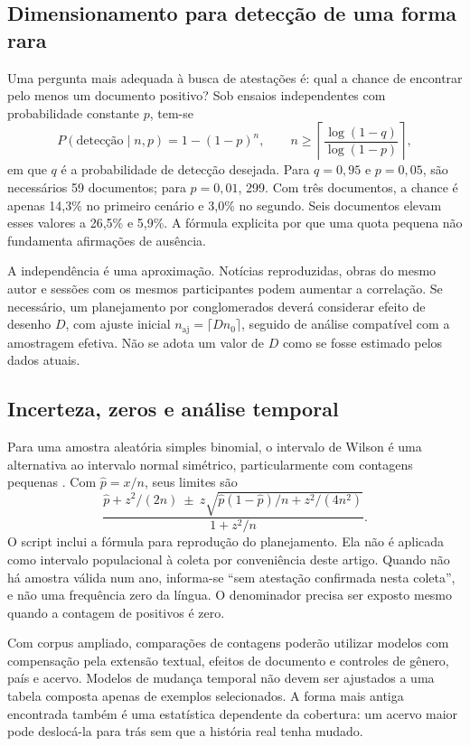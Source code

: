 \subsection{Dimensionamento para detecção de uma forma rara}
Uma pergunta mais adequada à busca de atestações é: qual a chance de encontrar pelo menos um documento positivo? Sob ensaios independentes com probabilidade constante $p$, tem-se
\begin{equation}
P(\text{detecção}\mid n,p)=1-(1-p)^n,
\qquad n\geq\left\lceil\frac{\log(1-q)}{\log(1-p)}\right\rceil,
\end{equation}
em que $q$ é a probabilidade de detecção desejada. Para $q=0{,}95$ e $p=0{,}05$, são necessários 59 documentos; para $p=0{,}01$, 299. Com três documentos, a chance é apenas 14,3\% no primeiro cenário e 3,0\% no segundo. Seis documentos elevam esses valores a 26,5\% e 5,9\%. A fórmula explicita por que uma quota pequena não fundamenta afirmações de ausência.



A independência é uma aproximação. Notícias reproduzidas, obras do mesmo autor e sessões com os mesmos participantes podem aumentar a correlação. Se necessário, um planejamento por conglomerados deverá considerar efeito de desenho $D$, com ajuste inicial $n_{\mathrm{aj}}=\lceil D n_0\rceil$, seguido de análise compatível com a amostragem efetiva. Não se adota um valor de $D$ como se fosse estimado pelos dados atuais.

\subsection{Incerteza, zeros e análise temporal}
Para uma amostra aleatória simples binomial, o intervalo de Wilson é uma alternativa ao intervalo normal simétrico, particularmente com contagens pequenas \cite{wilson1927}. Com $\hat p=x/n$, seus limites são
\begin{equation}
\frac{\hat p+z^2/(2n)\ \pm\ z\sqrt{\hat p(1-\hat p)/n+z^2/(4n^2)}}{1+z^2/n}.
\end{equation}
O script inclui a fórmula para reprodução do planejamento. Ela não é aplicada como intervalo populacional à coleta por conveniência deste artigo. Quando não há amostra válida num ano, informa-se ``sem atestação confirmada nesta coleta'', e não uma frequência zero da língua. O denominador precisa ser exposto mesmo quando a contagem de positivos é zero.

Com corpus ampliado, comparações de contagens poderão utilizar modelos com compensação pela extensão textual, efeitos de documento e controles de gênero, país e acervo. Modelos de mudança temporal não devem ser ajustados a uma tabela composta apenas de exemplos selecionados. A forma mais antiga encontrada também é uma estatística dependente da cobertura: um acervo maior pode deslocá-la para trás sem que a história real tenha mudado.

